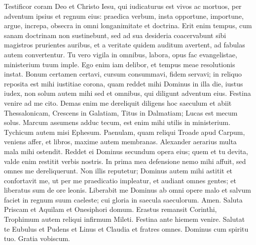 \begin{biblechapter} 
\verse Testificor coram Deo et Christo Iesu, qui iudicaturus est vivos ac mortuos, per adventum ipsius et regnum eius: 
\verse praedica verbum, insta opportune, importune, argue, increpa, obsecra in omni longanimitate et doctrina. 
\verse Erit enim tempus, cum sanam doctrinam non sustinebunt, sed ad sua desideria coacervabunt sibi magistros prurientes auribus, 
\verse et a veritate quidem auditum avertent, ad fabulas autem convertentur. 
\verse Tu vero vigila in omnibus, labora, opus fac evangelistae, ministerium tuum imple. 
\verse Ego enim iam delibor, et tempus meae resolutionis instat. 
\verse Bonum certamen certavi, cursum consummavi, fidem servavi; 
\verse in reliquo reposita est mihi iustitiae corona, quam reddet mihi Dominus in illa die, iustus iudex, non solum autem mihi sed et omnibus, qui diligunt adventum eius. 
\verse Festina venire ad me cito. 
\verse Demas enim me dereliquit diligens hoc saeculum et abiit Thessalonicam, Crescens in Galatiam, Titus in Dalmatiam;  
\verse Lucas est mecum solus. Marcum assumens adduc tecum, est enim mihi utilis in ministerium. 
\verse Tychicum autem misi Ephesum. 
\verse Paenulam, quam reliqui Troade apud Carpum, veniens affer, et libros, maxime autem membranas. 
\verse Alexander aerarius multa mala mihi ostendit. Reddet ei Dominus secundum opera eius;  
\verse quem et tu devita, valde enim restitit verbis nostris. 
\verse In prima mea defensione nemo mihi affuit, sed omnes me dereliquerunt. Non illis reputetur; 
\verse Dominus autem mihi astitit et confortavit me, ut per me praedicatio impleatur, et audiant omnes gentes; et liberatus sum de ore leonis. 
\verse Liberabit me Dominus ab omni opere malo et salvum faciet in regnum suum caeleste; cui gloria in saecula saeculorum. Amen. 
\verse Saluta Priscam et Aquilam et Onesiphori domum. 
\verse Erastus remansit Corinthi, Trophimum autem reliqui infirmum Mileti. 
\verse Festina ante hiemem venire. Salutat te Eubulus et Pudens et Linus et Claudia et fratres omnes. 
\verse Dominus cum spiritu tuo. Gratia vobiscum.
\end{biblechapter}
